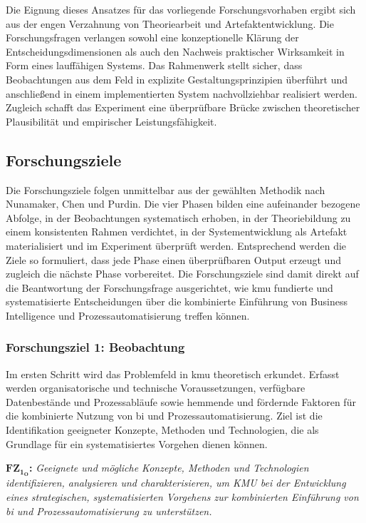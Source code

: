 Die Eignung dieses Ansatzes für das vorliegende Forschungsvorhaben ergibt sich aus der engen Verzahnung von Theoriearbeit und Artefaktentwicklung. Die Forschungsfragen verlangen sowohl eine konzeptionelle Klärung der Entscheidungsdimensionen als auch den Nachweis praktischer Wirksamkeit in Form eines lauffähigen Systems. Das Rahmenwerk stellt sicher, dass Beobachtungen aus dem Feld in explizite Gestaltungsprinzipien überführt und anschließend in einem implementierten System nachvollziehbar realisiert werden. Zugleich schafft das Experiment eine überprüfbare Brücke zwischen theoretischer Plausibilität und empirischer Leistungsfähigkeit. 


\subsection*{Forschungsziele}\label{sec:forschungsziele}

Die Forschungsziele folgen unmittelbar aus der gewählten Methodik nach Nunamaker, Chen und Purdin. Die vier Phasen bilden eine aufeinander bezogene Abfolge, in der Beobachtungen systematisch erhoben, in der Theoriebildung zu einem konsistenten Rahmen verdichtet, in der Systementwicklung als Artefakt materialisiert und im Experiment überprüft werden. \cite{NunamakerChen:Online} Entsprechend werden die Ziele so formuliert, dass jede Phase einen überprüfbaren Output erzeugt und zugleich die nächste Phase vorbereitet. Die Forschungsziele sind damit direkt auf die Beantwortung der Forschungsfrage ausgerichtet, wie \gls{kmu} fundierte und systematisierte Entscheidungen über die kombinierte Einführung von Business Intelligence und Prozessautomatisierung treffen können.

\subsubsection*{Forschungsziel 1: Beobachtung}
Im ersten Schritt wird das Problemfeld in \gls{kmu} theoretisch erkundet. Erfasst werden organisatorische und technische Voraussetzungen, verfügbare Datenbestände und Prozessabläufe sowie hemmende und fördernde Faktoren für die kombinierte Nutzung von \gls{bi} und Prozessautomatisierung. Ziel ist die Identifikation geeigneter Konzepte, Methoden und Technologien, die als Grundlage für ein systematisiertes Vorgehen dienen können.

\textbf{$\textbf{FZ}_{\textbf{1}_\textbf{O}}$:} \emph{Geeignete und mögliche Konzepte, Methoden und Technologien identifizieren, analysieren und charakterisieren, um KMU bei der Entwicklung eines strategischen, systematisierten Vorgehens zur kombinierten Einführung von \gls{bi} und Prozessautomatisierung zu unterstützen.}

